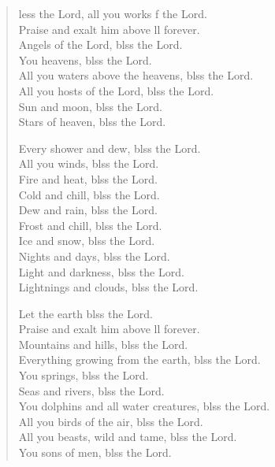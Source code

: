 \settowidth{\versewidth}{Let us bless the Father, and the Son, and the Holy Spirit. *}
\begin{verse}%
  \begin{patverse}
    less the Lord, all you works f the Lord.\Med\\
Praise and exalt him above ll forever.\\
Angels of the Lord, blss the Lord.\Med\\
You heavens, blss the Lord.\\
All you waters above the heavens, blss the Lord.\Med\\
All you hosts of the Lord, blss the Lord.\\
Sun and moon, blss the Lord.\Med\\
Stars of heaven, blss the Lord.

Every shower and dew, blss the Lord.\Med\\
All you winds, blss the Lord.\\
Fire and heat, blss the Lord.\Med\\
Cold and chill, blss the Lord.\\
Dew and rain, blss the Lord.\Med\\
Frost and chill, blss the Lord.\\
Ice and snow, blss the Lord.\Med\\
Nights and days, blss the Lord.\\
Light and darkness, blss the Lord.\Med\\
Lightnings and clouds, blss the Lord.

Let the earth blss the Lord.\Med\\
Praise and exalt him above ll forever.\\
Mountains and hills, blss the Lord.\Med\\
Everything growing from the earth, blss the Lord.\\
You springs, blss the Lord.\Med\\
Seas and rivers, blss the Lord.\\
You dolphins and all water creatures, blss the Lord.\Med\\
All you birds of the air, blss the Lord.\\
All you beasts, wild and tame, blss the Lord.\Med\\
You sons of men, blss the Lord.


\end{patverse}
\end{verse}
